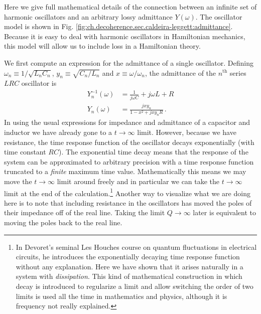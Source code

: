 
Here we give full mathematical details of the connection between an infinite set of harmonic oscillators and an arbitrary lossy admittance $Y(\omega)$.
The oscillator model is shown in Fig. \ref{fig:ch.decoherence.sec.caldeira-leggett:admittance}.
Because it is easy to deal with harmonic oscillators in Hamiltonian mechanics, this model will allow us to include loss in a Hamiltonian theory.


We first compute an expression for the admittance of a single oscillator.
Defining $\omega_n \equiv 1/\sqrt{L_n C_n}$, $y_n \equiv \sqrt{C_n / L_n}$ and $x \equiv \omega / \omega_n$, the admittance of the $n^{\text{th}}$ series $LRC$ oscillator is
\begin{align}
Y_n^{-1}(\omega) &= \frac{1}{j \omega C} + j \omega L + R \\
Y_n(\omega) &= \frac{j x y_n}{1 - x^2 + j x y_n R} \, .
\end{align}
In using the usual expressions for impedance and admittance of a capacitor and inductor we have already gone to a $t \rightarrow \infty$ limit.
However, because we have resistance, the time response function of the oscillator decays exponentially (with time constant $RC$).
The exponential time decay means that the response of the system can be approximated to arbitrary precision with a time response function truncated to a \emph{finite} maximum time value.
Mathematically this means we may move the $t \rightarrow \infty$ limit around freely and in particular we can take the $t \rightarrow \infty$ limit at the end of the calculation.\footnote{In Devoret's seminal Les Houches course on quantum fluctuations in electrical circuits, he introduces the exponentially decaying time response function without any explanation. Here we have shown that it arises naturally in a system with \emph{dissipation}. This kind of mathematical construction in which decay is introduced to regularize a limit and allow switching the order of two limits is used all the time in mathematics and physics, although it is frequency not really explained.}
Another way to visualize what we are doing here is to note that including resistance in the oscillators has moved the poles of their impedance off of the real line.
Taking the limit $Q \rightarrow \infty$ later is equivalent to moving the poles back to the real line.

